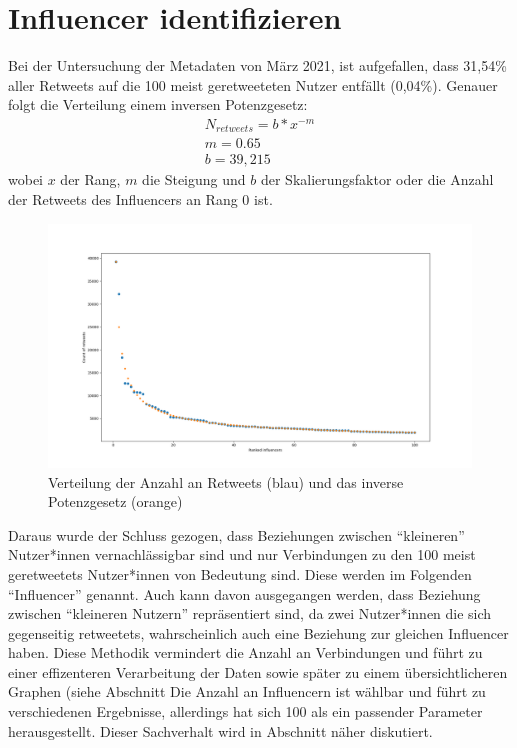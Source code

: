\section{Influencer identifizieren}
\label{sec:influencer}
Bei der Untersuchung der Metadaten von März 2021, ist aufgefallen, dass 31,54\% aller \glspl{Retweet} auf die 100 meist geretweeteten Nutzer entfällt (0,04\%).
Genauer folgt die Verteilung einem inversen Potenzgesetz:
\begin{equation}
	\begin{aligned}
		N_{retweets} = b*x^{-m}\\
		m = 0.65\\
		b = 39,215
	\end{aligned}
\end{equation}
wobei $x$ der Rang, $m$ die Steigung und $b$ der Skalierungsfaktor oder die Anzahl der Retweets des Influencers an Rang 0 ist.\\
\begin{figure}[h!]
	\centering
	\includegraphics[width=0.8\linewidth]{images/power-law}
	\caption{Verteilung der Anzahl an \glspl{Retweet} (blau) und das inverse Potenzgesetz (orange)}
	\label{fig:tweetverteilung}
\end{figure}
Daraus wurde der Schluss gezogen, dass Beziehungen zwischen "`kleineren"' Nutzer*innen vernachlässigbar sind und nur Verbindungen zu den 100 meist \glspl{geretweetet} Nutzer*innen von Bedeutung sind. Diese werden im Folgenden "`Influencer"' genannt. Auch kann davon ausgegangen werden, dass Beziehung zwischen "`kleineren Nutzern"'  repräsentiert sind, da zwei Nutzer*innen die sich gegenseitig \glspl{retweetet}, wahrscheinlich auch eine Beziehung zur gleichen Influencer haben. 
Diese Methodik vermindert die Anzahl an Verbindungen und führt zu einer effizenteren Verarbeitung der Daten sowie später zu einem übersichtlicheren Graphen (siehe Abschnitt %
Die Anzahl an Influencern ist wählbar und führt zu verschiedenen Ergebnisse, allerdings hat sich 100 als ein passender Parameter herausgestellt. Dieser Sachverhalt wird in Abschnitt näher diskutiert.


